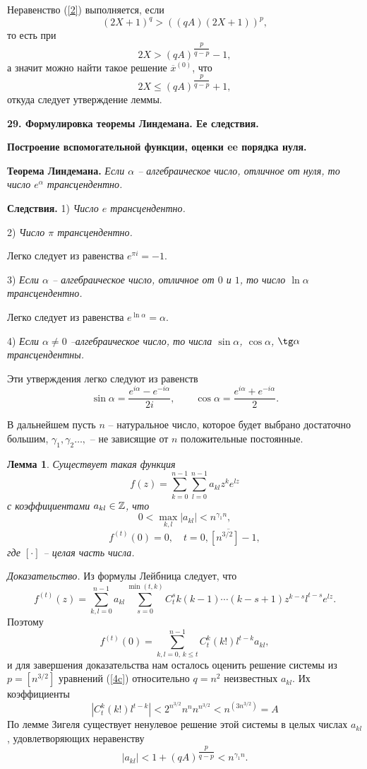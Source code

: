 \documentclass[12pt]{article}
\newtheorem{lemma}{Лемма}
\let\ol\overline
\begin{document}
Неравенство (\ref {2})   выполняется, если
$$
(2X+1)^q > ((qA)(2X+1))^p,
$$
то есть при
$$
2X > (qA)^{\dfrac p{q-p}} -1,
$$
а значит можно найти такое решение $\ol x^{(0)}$, что
$$
2X \le (qA)^{\dfrac p{q-p}} +1,
$$
откуда следует утверждение леммы.


\vskip 5mm \centerline{\bf {29. Формулировка теоремы Линдемана. Ее
следствия.}  } \centerline{\bf {Построение вспомогательной
функции, оценки ee порядка нуля.}} \vskip 5mm

 {\bf Теорема Линдемана.}  {\it Если  $\alpha$ --   алгебраическое
число, отличное от нуля, то число $e^{\alpha}$ трансцендентно.}

{\bf Следствия.} 1)  {\it  Число $e$ трансцендентно.}


 2)  {\it Число $\pi$ трансцендентно.}

 Легко следует из равенства $e^{\pi i}=-1$.

3)  {\it Если $\alpha$ -- алгебраическое число, отличное от $0$ и
$1$, то число $\ln {\alpha}$ трансцендентно.}

Легко следует из равенства $e^{\ln \alpha}= \alpha$.

4) {\it Если $\alpha \ne 0$ --алгебраическое число, то числа $\sin
\alpha$, $\cos \alpha$, $\tg \alpha$ трансцендентны.}

Эти утверждения легко следуют из равенств
$$
\sin \alpha = \frac {e^{i \alpha}- e^{-i \alpha}}{2i}, \qquad \cos
\alpha = \frac {e^{i \alpha}+ e^{-i \alpha}}{2}.
$$


В дальнейшем пусть $n$ -- натуральное число, которое будет выбрано
достаточно большим, $\gamma_1, \gamma_2 \dots, $ -- не зависящие
от $n$ положительные постоянные.

\begin{lemma}\label{L} Существует такая функция
\begin{equation}\label{4a}
f(z)=\sum_{k=0}^{n-1} \sum_{l=0}^{n-1} a_{kl}z^k e^{lz}
\end{equation} с коэффициентами $a_{kl} \in \Bbb Z$, что
\begin{equation}\label{4b}
 0 < \max_{k,l} |a_{kl}| < n^{\gamma_1n},
\end{equation}
\begin{equation}\label{4c}
f^{(t)}(0)=0, \quad t= \ol {0,[n^{3/2}]-1},
\end{equation}
где $[\cdot]$  -- целая часть числа.
 \end{lemma}

\emph{Доказательство.}  Из формулы Лейбница следует, что
\begin{equation}\label{5}
f^{(t)}(z)= \sum_{k,l=0}^{n-1}a_{kl} \sum_{s=0}^{\min (t,k)}C_t^s
k(k-1) \cdots (k-s+1) z^{k-s} l^{t-s} e^{lz}. \end{equation}
Поэтому
$$
f^{(t)}(0)=\sum_{k,l=0,\, k\le t}^{n-1}C_t^k(k!)l^{t-k}a_{kl},
$$
и для завершения доказательства нам осталось оценить решение
системы из $p=[n^{3/2}]$ уравнений (\ref{4c}) относительно $q=n^2$
неизвестных  $a_{kl}$. Их коэффициенты
$$
|C_t^k(k!)l^{t-k}|<2^{n^{3/2}}n^nn^{n^{3/2}}<n^{(3n^{3/2})}=A
$$
По лемме Зигеля существует ненулевое решение этой системы в целых
числах $a_{kl}$, удовлетворяющих неравенству
$$
|a_{kl}|<1+(qA)^{\dfrac p{q-p}}<n^{\gamma_1n}.
$$
\end{document}
